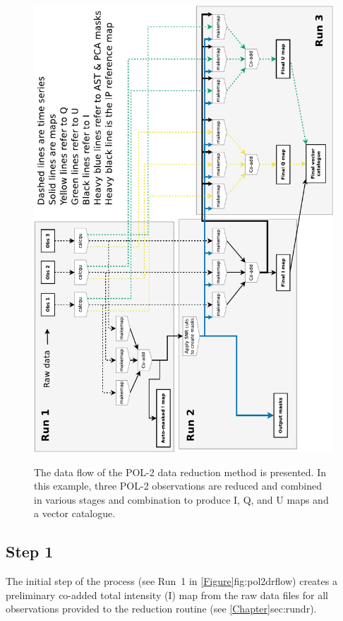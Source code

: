 \begin{figure}[t!]
\begin{center}
{\includegraphics[width=1.0\linewidth]{pol2map_flow}}
\caption [POL-2 Data Flow]{ The data flow of the POL-2 data reduction
  method is presented. In this example, three POL-2 observations are
  reduced and combined in various stages and combination to produce I,
  Q, and U maps and a vector catalogue.  }
\label{fig:pol2drflow}
\end{center}
\end{figure}


\subsection*{Step 1}

The initial step of the process (see Run~1 in \cref{Figure}{fig:pol2drflow}{})
creates a preliminary co-added total intensity
(I) map from the raw data files for all observations provided to the
reduction routine (see \cref{Chapter}{sec:rundr}{}).


